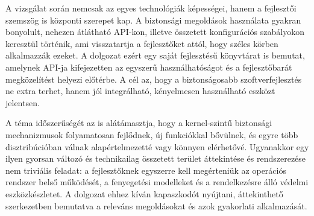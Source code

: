 A vizsgálat során nemcsak az egyes technológiák képességei, hanem a fejlesztői szemszög is központi szerepet kap. A biztonsági megoldások használata gyakran bonyolult, nehezen átlátható API-kon, illetve összetett konfigurációs szabályokon keresztül történik, ami visszatartja a fejlesztőket attól, hogy széles körben alkalmazzák ezeket. A dolgozat ezért egy saját fejlesztésű könyvtárat is bemutat, amelynek API-ja kifejezetten az egyszerű használhatóságot és a fejlesztőbarát megközelítést helyezi előtérbe. A cél az, hogy a biztonságosabb szoftverfejlesztés ne extra terhet, hanem jól integrálható, kényelmesen használható eszközt jelentsen.

A téma időszerűségét az is alátámasztja, hogy a kernel-szintű biztonsági mechanizmusok folyamatosan fejlődnek, új funkciókkal bővülnek, és egyre több disztribúcióban válnak alapértelmezetté vagy könnyen elérhetővé. Ugyanakkor egy ilyen gyorsan változó és technikailag összetett terület áttekintése és rendszerezése nem triviális feladat: a fejlesztőknek egyszerre kell megérteniük az operációs rendszer belső működését, a fenyegetési modelleket és a rendelkezésre álló védelmi eszközkészletet. A dolgozat ehhez kíván kapaszkodót nyújtani, áttekinthető szerkezetben bemutatva a releváns megoldásokat és azok gyakorlati alkalmazását.
